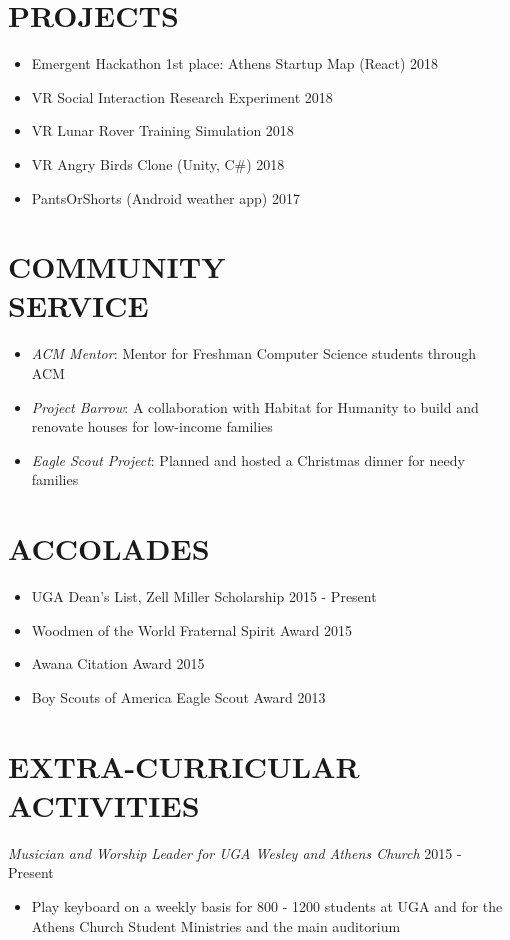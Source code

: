 \documentclass[line,margin]{res}
\begin{document}
\begin{resume}
 \section{PROJECTS}
             \begin{itemize} \itemsep -2pt
             \item Emergent Hackathon 1st place: Athens Startup Map (React) \hfill 2018
             \item VR Social Interaction Research Experiment \hfill 2018
             \item VR Lunar Rover Training Simulation \hfill 2018
             \item VR Angry Birds Clone (Unity, C$\#$) \hfill 2018
             \item PantsOrShorts (Android weather app) \hfill 2017
	    \end{itemize}
	    
	    
\section{COMMUNITY \\ SERVICE} 
            \begin{itemize} \itemsep -2pt
            \item \textit{ACM Mentor}: Mentor for Freshman Computer Science students through ACM
	    \item \textit{Project Barrow}: A collaboration with Habitat for Humanity to build and renovate houses for low-income families
	    \item \textit{Eagle Scout Project}: Planned and hosted a Christmas dinner for needy families
	    \end{itemize}
\section{ACCOLADES}             
            \begin{itemize} \itemsep -2pt
            \item UGA Dean's List, Zell Miller Scholarship \hfill 2015 - Present
            \item Woodmen of the World Fraternal Spirit Award \hfill 2015
            \item Awana Citation Award \hfill 2015
            \item Boy Scouts of America Eagle Scout Award \hfill 2013
            \end{itemize}    
\section{EXTRA-CURRICULAR \\ ACTIVITIES}             
            {\sl Musician and Worship Leader for UGA Wesley and Athens Church} \hfill 2015 - Present
            \begin{itemize} \itemsep -2pt
            \item Play keyboard on a weekly basis for 800 - 1200 students at UGA and for the Athens Church Student Ministries and the main auditorium
            \end{itemize}
         
 

\end{resume}
\end{document}
